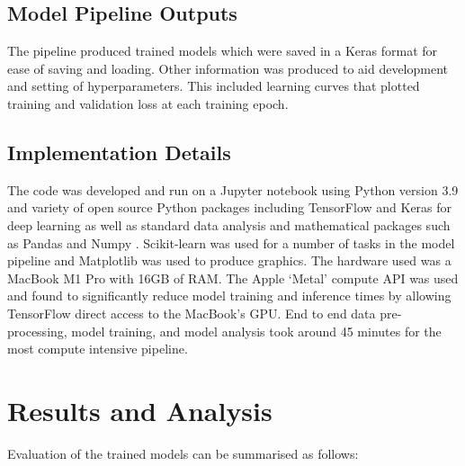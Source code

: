 \documentclass{mldsmsc}
\begin{document}
\section{Model Pipeline Outputs}
The pipeline produced  trained models which were saved in a Keras \citep{chollet2015keras} format for ease of saving and loading. Other information was produced to aid development and setting of hyperparameters. This included learning curves that plotted training and validation loss at each training epoch. 

\section{Implementation Details}
The code was developed and run on a Jupyter notebook \citep{Kluyver2016jupyter} using Python version 3.9 and variety of open source Python packages including TensorFlow \citep{tensorflow2015-whitepaper} and Keras \citep{chollet2015keras} for deep learning as well as standard data analysis and mathematical packages such as Pandas \citep{reback2020pandas} and Numpy \citep{harris2020array}. Scikit-learn \citep{scikit-learn} was used for a number of tasks in the model pipeline and Matplotlib \citep{Hunter:2007} was used to produce graphics. The hardware used was a MacBook M1 Pro with 16GB of RAM. The Apple `Metal' compute API was used and found to significantly reduce model training and inference times by allowing TensorFlow direct access to the MacBook's GPU. End to end data pre-processing, model training, and model analysis took around 45 minutes for the most compute intensive pipeline.

\chapter{Results and Analysis}

Evaluation of the trained models can be summarised as follows:
\end{document}
